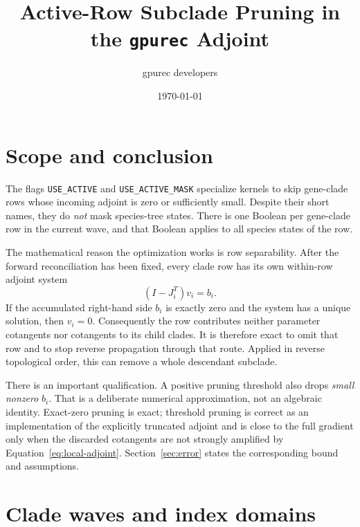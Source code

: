 \documentclass[11pt]{article}
\title{Active-Row Subclade Pruning in the \texttt{gpurec} Adjoint}
\author{gpurec developers}
\date{\today}
\newcommand{\code}[1]{\nolinkurl{#1}}
\begin{document}
\maketitle
\tableofcontents

\section{Scope and conclusion}

The flags \code{USE_ACTIVE} and \code{USE_ACTIVE_MASK} specialize kernels to
skip gene-clade rows whose incoming adjoint is zero or sufficiently small.
Despite their short names, they do \emph{not} mask species-tree states.  There
is one Boolean per gene-clade row in the current wave, and that Boolean applies
to all species states of the row.

The mathematical reason the optimization works is row separability.  After
the forward reconciliation has been fixed, every clade row has its own
within-row adjoint system
\begin{equation}
  (I-J_i^T)v_i=b_i.
  \label{eq:local-adjoint}
\end{equation}
If the accumulated right-hand side $b_i$ is exactly zero and the system has a
unique solution, then $v_i=0$.  Consequently the row contributes neither
parameter cotangents nor cotangents to its child clades.  It is therefore exact
to omit that row and to stop reverse propagation through that route.  Applied
in reverse topological order, this can remove a whole descendant subclade.

There is an important qualification.  A positive pruning threshold also drops
\emph{small nonzero} $b_i$.  That is a deliberate numerical approximation, not
an algebraic identity.  Exact-zero pruning is exact; threshold pruning is
correct as an implementation of the explicitly truncated adjoint and is close
to the full gradient only when the discarded cotangents are not strongly
amplified by Equation~\eqref{eq:local-adjoint}.  Section~\ref{sec:error}
states the corresponding bound and assumptions.

\section{Clade waves and index domains}
\end{document}
